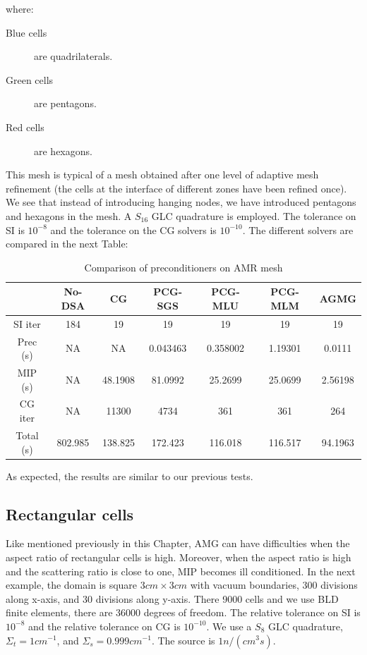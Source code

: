where:
\begin{description}
  \item[Blue cells] are quadrilaterals.
  \item[Green cells] are pentagons.
  \item[Red cells] are hexagons.
\end{description}
This mesh is typical of a mesh obtained after one level of adaptive mesh
refinement (the cells at the interface of different zones have been refined
once). We see that instead of introducing hanging nodes, we have introduced
pentagons and hexagons in the mesh.
A $S_{16}$ GLC quadrature is employed. The tolerance on SI is $10^{-8}$ and
the tolerance on the CG solvers is $10^{-10}$.
The different solvers are compared in the next Table:
\begin{table}[H]
  \caption{Comparison of preconditioners on AMR mesh}
  \begin{center}
    \begin{tabular}{|c|c|c|c|c|c|c|}
      \hline
       & No-DSA & CG & PCG-SGS & PCG-MLU & PCG-MLM & AGMG \\
      \hline
      SI iter    & 184     & 19      & 19       & 19      & 19       & 19 \\
      Prec (s)   & NA      & NA      & 0.043463 & 0.358002 & 1.19301 & 0.0111\\
      MIP (s)    & NA      & 48.1908 & 81.0992  & 25.2699 & 25.0699  & 
      2.56198\\
      CG iter    & NA      & 11300   & 4734     & 361     & 361      & 264 \\
      Total (s)  & 802.985 & 138.825 & 172.423  & 116.018 & 116.517  &
      94.1963\\
      \hline
    \end{tabular}
  \end{center}
\end{table}
As expected, the results are similar to our previous tests.

\subsection{Rectangular cells}
Like mentioned previously in this Chapter, AMG can have difficulties when the
aspect ratio of rectangular cells is high. Moreover, when the aspect ratio is
high and the scattering ratio is close to one,
MIP becomes ill conditioned. In the next example, the domain is 
square $3cm \times 3cm$ with vacuum boundaries, 300 divisions along x-axis, 
and 30 divisions along y-axis. There 9000 cells and we use BLD finite elements, 
there are 36000 degrees of freedom. The relative tolerance on SI is $10^{-8}$ 
and the relative tolerance on CG is $10^{-10}$. We use a $S_{8}$ GLC quadrature, 
$\Sigma_t = 1 cm^{-1}$, and $\Sigma_s = 0.999 cm^{-1}$. The source is
$1n/(cm^3s)$.

